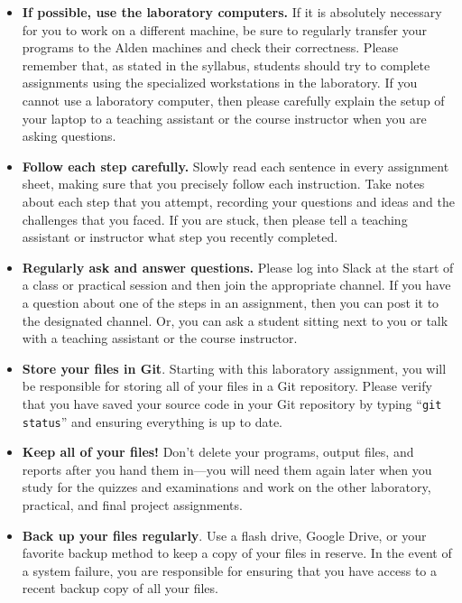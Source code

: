 \vspace*{-.1in}
\begin{itemize}
  \setlength{\itemsep}{-.01in}

\item {\bf If possible, use the laboratory computers.} If it is absolutely necessary for you to work on a different
  machine, be sure to regularly transfer your programs to the Alden machines and check their correctness. Please
  remember that, as stated in the syllabus, students should try to complete assignments using the specialized
  workstations in the laboratory. If you cannot use a laboratory computer, then please carefully explain the setup of
  your laptop to a teaching assistant or the course instructor when you are asking questions.

\item {\bf Follow each step carefully.} Slowly read each sentence in every assignment sheet, making sure that you
  precisely follow each instruction. Take notes about each step that you attempt, recording your questions and ideas
  and the challenges that you faced. If you are stuck, then please tell a teaching assistant or instructor what step
  you recently completed.

\item {\bf Regularly ask and answer questions.} Please log into Slack at the start of a class or practical session and
  then join the appropriate channel. If you have a question about one of the steps in an assignment, then you can post
  it to the designated channel. Or, you can ask a student sitting next to you or talk with a teaching assistant or the
  course instructor.

\item {\bf Store your files in Git}. Starting with this laboratory assignment, you will be responsible for storing all
  of your files in a Git repository. Please verify that you have saved your source code in your Git repository by
  typing ``{\tt git status}'' and ensuring everything is up to date.

\item {\bf Keep all of your files!} Don't delete your programs, output files, and reports after you hand them in---you
  will need them again later when you study for the quizzes and examinations and work on the other laboratory,
  practical, and final project assignments.

\item {\bf Back up your files regularly}. Use a flash drive, Google Drive, or your favorite backup method to keep a
  copy of your files in reserve. In the event of a system failure, you are responsible for ensuring that you have
  access to a recent backup copy of all your files.


\end{itemize}

